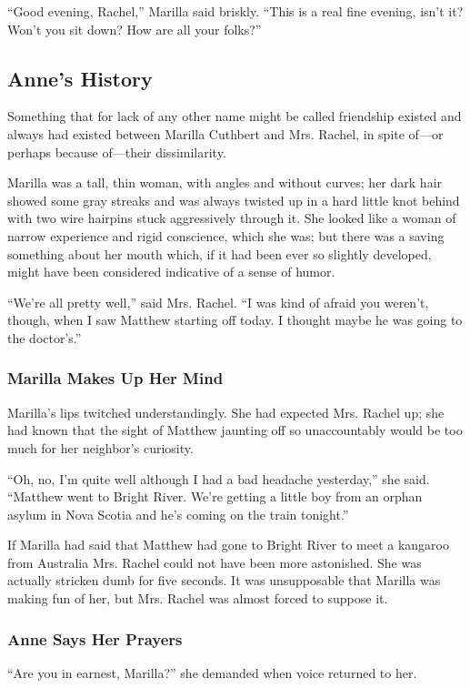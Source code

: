 \documentclass{article}
\begin{document}
``Good evening, Rachel,'' Marilla said briskly. ``This is a real fine evening, isn't it? Won't you sit down? How are all your folks?''

\subsection{Anne's History}
Something that for lack of any other name might be called friendship existed and always had existed between Marilla Cuthbert and Mrs. Rachel, in spite of---or perhaps because of---their dissimilarity.

Marilla was a tall, thin woman, with angles and without curves; her dark hair showed some gray streaks and was always twisted up in a hard little knot behind with two wire hairpins stuck aggressively through it. She looked like a woman of narrow experience and rigid conscience, which she was; but there was a saving something about her mouth which, if it had been ever so slightly developed, might have been considered indicative of a sense of humor.

``We're all pretty well,'' said Mrs. Rachel. ``I was kind of afraid you weren't, though, when I saw Matthew starting off today. I thought maybe he was going to the doctor's.''

\subsubsection{Marilla Makes Up Her Mind}
Marilla's lips twitched understandingly. She had expected Mrs. Rachel up; she had known that the sight of Matthew jaunting off so unaccountably would be too much for her neighbor's curiosity.

``Oh, no, I'm quite well although I had a bad headache yesterday,'' she said. ``Matthew went to Bright River. We're getting a little boy from an orphan asylum in Nova Scotia and he's coming on the train tonight.''

If Marilla had said that Matthew had gone to Bright River to meet a kangaroo from Australia Mrs. Rachel could not have been more astonished. She was actually stricken dumb for five seconds. It was unsupposable that Marilla was making fun of her, but Mrs. Rachel was almost forced to suppose it.

\subsubsection{Anne Says Her Prayers}
``Are you in earnest, Marilla?'' she demanded when voice returned to her.
\end{document}
